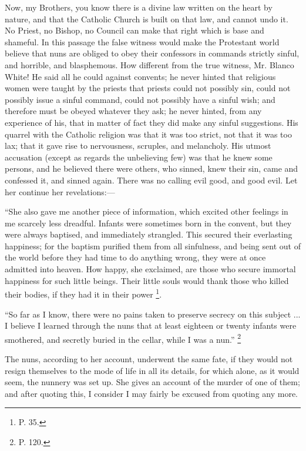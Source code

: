 Now, my Brothers, you know there is a divine law
written on the heart by nature, and that the Catholic
Church is built on that law, and cannot undo it. No
Priest, no Bishop, no Council can make that right which
is base and shameful. In this passage the false witness
would make the Protestant world believe that nuns are
obliged to obey their confessors in commands strictly
sinful, and horrible, and blasphemous. How different from
the true witness, Mr. Blanco White! He said all he could
against convents; he never hinted that religious women
were taught by the priests that priests could not
possibly sin, could not possibly issue a sinful command,
could not possibly have a sinful wish; and therefore must
be obeyed whatever they ask; he never hinted, from any
experience of his, that in matter of fact they did make
any sinful suggestions. His quarrel with the Catholic
religion was that it was too strict, not that it was too
lax; that it gave rise to nervousness, scruples, and
melancholy. His utmost accusation (except as regards the
unbelieving few) was that he knew some persons, and he
believed there were others, who sinned, knew their sin,
came and confessed it, and sinned again. There was no
calling evil good, and good evil. Let her continue her
revelations:—

``She also gave me another piece of information,
which excited other feelings in me scarcely less
dreadful. Infants were sometimes born in the convent, but
they were always baptised, and immediately strangled.
This secured their everlasting happiness; for the baptism
purified them from all sinfulness, and being sent out of
the world before they had time to do anything wrong, they
were at once admitted into heaven. How happy, she
exclaimed, are those who secure immortal happiness for
such little beings. Their little souls would thank those
who killed their bodies, if they had it in their power \footnote{P. 35.}.

``So far as I know, there were no pains taken to
preserve secrecy on this subject ... I believe I learned
through the nuns that at least eighteen or twenty infants
were smothered, and secretly buried in the cellar, while
I was a nun.'' \footnote{P. 120.}

The nuns, according to her account, underwent the same
fate, if they would not resign themselves to the mode of
life in all its details, for which alone, as it would
seem, the nunnery was set up. She gives an account of the
murder of one of them; and after quoting this, I consider
I may fairly be excused from quoting any more.

